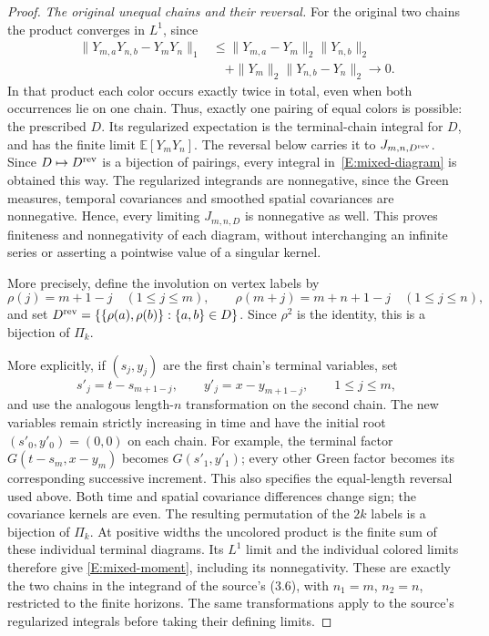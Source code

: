 \documentclass[12pt]{article}
\numberwithin{equation}{section}
\theoremstyle{definition}
\newcommand{\E}{\mathbb{E}}
\begin{document}
\begin{proof}
  \emph{The original unequal chains and their reversal.}
  For the original two chains the product converges in $L^1$, since
  \[
    \begin{split}
      \|Y_{m,a}Y_{n,b}-Y_mY_n\|_1
      &\le\|Y_{m,a}-Y_m\|_2\|Y_{n,b}\|_2\\
      &\quad+\|Y_m\|_2\|Y_{n,b}-Y_n\|_2\longrightarrow0.
    \end{split}
  \]
  In that product each color occurs exactly twice in total, even when
  both occurrences lie on one chain. Thus, exactly one pairing of equal
  colors is possible: the prescribed $D$. Its regularized expectation
  is the terminal-chain integral for $D$, and has the finite limit
  $\E[Y_mY_n]$. The reversal below carries it to $J_{m,n,D^{\rm rev}}$.
  Since $D\mapsto D^{\rm rev}$ is a bijection of pairings, every
  integral in~\eqref{E:mixed-diagram} is obtained this way.
  The regularized integrands are nonnegative, since the Green measures,
  temporal covariances and smoothed spatial covariances are nonnegative.
  Hence, every limiting $J_{m,n,D}$ is nonnegative as well. This proves
  finiteness and nonnegativity of each diagram, without interchanging
  an infinite series or asserting a pointwise value of a singular kernel.

  More precisely, define the involution on vertex labels by
  \[
    \rho(j)=m+1-j\quad(1\le j\le m),\qquad
    \rho(m+j)=m+n+1-j\quad(1\le j\le n),
  \]
  and set $D^{\rm rev}=\{\{\rho(a),\rho(b)\}:\{a,b\}\in D\}$.
  Since $\rho^2$ is the identity, this is a bijection of $\Pi_k$.

  More explicitly, if $(s_j,y_j)$ are the first chain's terminal
  variables, set
  \[
    s'_j=t-s_{m+1-j},\qquad y'_j=x-y_{m+1-j},
    \qquad 1\le j\le m,
  \]
  and use the analogous length-$n$ transformation on the second chain.
  The new variables remain strictly increasing in time and have the
  initial root $(s'_0,y'_0)=(0,0)$ on each chain. For example, the
  terminal factor $G(t-s_m,x-y_m)$ becomes $G(s'_1,y'_1)$;
  every other Green factor becomes its corresponding successive
  increment. This also specifies the equal-length reversal used above.
  Both time and spatial covariance differences change sign; the covariance
  kernels are even. The resulting permutation of the $2k$ labels is a
  bijection of $\Pi_k$. At positive widths the uncolored product is
  the finite sum of these individual terminal diagrams. Its $L^1$
  limit and the individual colored limits therefore give
  \eqref{E:mixed-moment}, including its
  nonnegativity. These are exactly the two chains in the integrand of
  the source's (3.6), with $n_1=m$, $n_2=n$, restricted to the finite
  horizons. The same transformations apply to the source's regularized
  integrals before taking their defining limits.


\end{proof}
\end{document}
